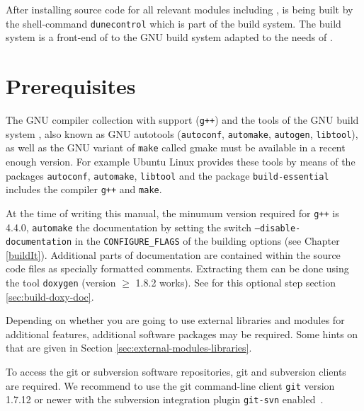 After installing source code for all relevant \Dune modules including
\eWoms, \Dune is being built by the shell-command \texttt{dunecontrol}
which is part of the \Dune build system. The \Dune build system is a
front-end of to the GNU build system adapted to the needs of \Dune.

\section{Prerequisites} \label{sec:prerequisites}

The GNU compiler collection with \Cplusplus support (\texttt{g++}) and
the tools of the GNU build system \cite{GNU-BS}, also known as GNU
autotools (\texttt{autoconf}, \texttt{automake}, \texttt{autogen},
\texttt{libtool}), as well as the GNU variant of \texttt{make} called
gmake must be available in a recent enough version. For example Ubuntu
Linux provides these tools by means of the packages \texttt{autoconf},
\texttt{automake}, \texttt{libtool} and the  package 
\texttt{build-essential} includes the \Cplusplus compiler
\texttt{g++} and \texttt{make}.

At the time of writing this manual, the minumum version required for
\texttt{g++} is 4.4.0, \texttt{automake}  the documentation by setting the switch
\texttt{--disable-documentation} in the \texttt{CONFIGURE\_FLAGS} of
the building options (see Chapter \ref{buildIt}).  Additional parts of
documentation are contained within the source code files as specially
formatted comments.  Extracting them can be done using the tool
\texttt{doxygen} (version $\geqslant$ 1.8.2 works).  See for this
optional step section \ref{sec:build-doxy-doc}.

Depending on whether you are going to use external libraries and
modules for additional \Dune features, additional software packages
may be required. Some hints on that are given in Section
\ref{sec:external-modules-libraries}.

To access the git or subversion software repositories, git and
subversion clients are required. We recommend to use the git
command-line client \texttt{git} version 1.7.12 or newer with the
subversion integration plugin \texttt{git-svn} enabled~\cite{GIT-HP}.

